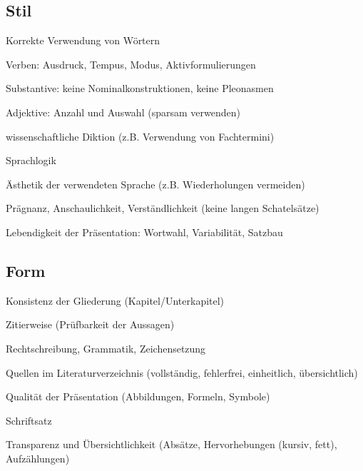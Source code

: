 \documentclass[a4paper,oneside,DIV8,10pt]{scrartcl}
\begin{document}
    \subsection{Stil}
    \begin{compactitem}
        \item Korrekte Verwendung von Wörtern
        \begin{compactitem}
            \item Verben: Ausdruck, Tempus, Modus, Aktivformulierungen
            \item Substantive: keine Nominalkonstruktionen, keine Pleonasmen
            \item Adjektive: Anzahl und Auswahl (sparsam verwenden)
        \end{compactitem}
        \item wissenschaftliche Diktion (z.B. Verwendung von Fachtermini)
        \item Sprachlogik
        \item Ästhetik der verwendeten Sprache (z.B. Wiederholungen vermeiden)
        \item Prägnanz, Anschaulichkeit, Verständlichkeit (keine langen Schatelsätze)
        \item Lebendigkeit der Präsentation: Wortwahl, Variabilität, Satzbau
    \end{compactitem}

    \subsection{Form}
    \begin{compactitem}
        \item Konsistenz der Gliederung (Kapitel/Unterkapitel)
        \item Zitierweise (Prüfbarkeit der Aussagen)
        \item Rechtschreibung, Grammatik, Zeichensetzung
        \item Quellen im Literaturverzeichnis (vollständig, fehlerfrei, einheitlich, übersichtlich)
        \item Qualität der Präsentation (Abbildungen, Formeln, Symbole)
        \item Schriftsatz
        \item Transparenz und Übersichtlichkeit (Absätze, Hervorhebungen (kursiv, fett), Aufzählungen)
    \end{compactitem}
    
\end{document}
